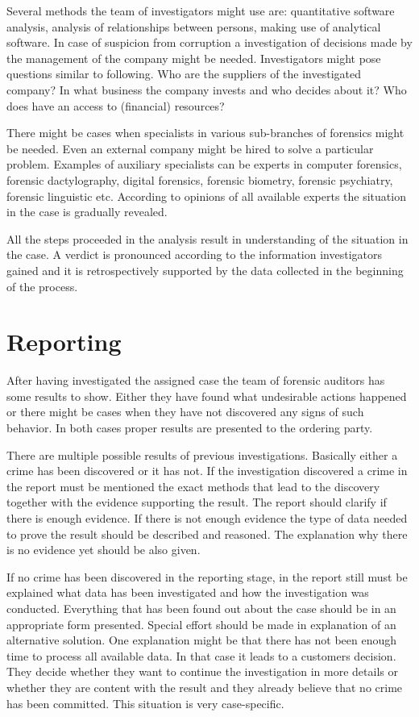 Several methods the team of investigators might use are: quantitative software analysis, analysis of relationships between persons, making use of analytical software. In case of  suspicion from corruption a investigation of decisions made by the management of the company might be needed. Investigators might pose questions similar to following. Who are the suppliers of the investigated company? In what business the company invests and who decides about it? Who does have an access to (financial) resources?


There might be cases when specialists in various sub-branches of forensics might be needed. Even an external company might be hired to solve a particular problem. Examples of auxiliary specialists can be experts in computer forensics, forensic dactylography, digital forensics, forensic biometry, forensic psychiatry, forensic linguistic etc. According to opinions of all available experts the situation in the case is gradually revealed.

All the steps proceeded in the analysis result in understanding of the situation in the case. A verdict is pronounced according to the information investigators gained and it is retrospectively supported by the data collected in the beginning of the process. 

\section{Reporting}

After having investigated the assigned case the team of forensic auditors has some results to show. Either they have found what undesirable actions happened or there might be cases when they have not discovered any signs of such behavior. In both cases proper results are presented to the ordering party. 




There are multiple possible results of previous investigations. Basically either a crime has been discovered or it has not. If the investigation discovered a crime in the report must be mentioned the exact methods that lead to the discovery together with the evidence supporting the result. The report should clarify if there is enough evidence. If there is not enough evidence the type of data needed to prove the result should be described and reasoned. The explanation why there is no evidence yet should be also given.


If no crime has been discovered in the reporting stage, in the report still must be explained what data has been investigated and how the investigation was conducted. Everything that has been found out about the case should be in an appropriate form presented. Special effort should be made in explanation of an alternative solution. One explanation might be that there has not been enough time to process all available data. In that case it leads to a customers decision. They decide whether they want to continue the investigation in more details or whether they are content with the result and they already believe that no crime has been committed. This situation is very case-specific. 


